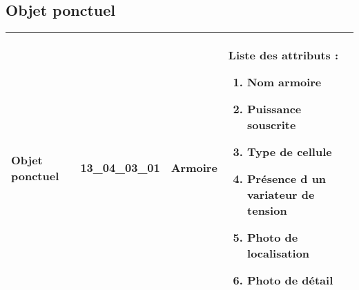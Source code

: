 \documentclass[12pt,titlepage]{book}
\begin{document}
\subsection{Objet ponctuel}
\noindent
\vspace{\baselineskip}

\renewcommand{\arraystretch}{1.2}
\begin{supertabular}{|p{10cm}|c|p{13cm}|p{12cm}|}
 Objet ponctuel & 13\_04\_03\_01 & Armoire & Liste des attributs :
\begin{enumerate}
  \item Nom armoire  \item Puissance souscrite  \item Type de cellule  \item Présence d un variateur de tension  \item Photo de localisation  \item Photo de détail\end{enumerate}
\\
\hline
\end{supertabular}
\end{document}
